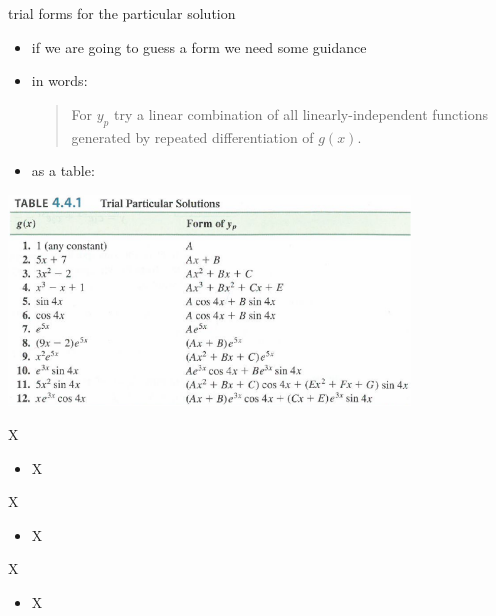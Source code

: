\documentclass{beamer}
\begin{document}
\begin{frame}{trial forms for the particular solution}

\begin{itemize}
\item if we are going to guess a form we need some guidance
\item in words:

\begin{quotation}
\noindent For $y_p$ try a linear combination of all linearly-independent functions generated by repeated differentiation of $g(x)$.
\end{quotation}

\vspace{-3mm}
\item as a table:
\end{itemize}

\hfill \includegraphics[width=0.8\textwidth]{figs/yptable}
\end{frame}


\begin{frame}{X}

\begin{itemize}
\item X
\end{itemize}
\end{frame}


\begin{frame}{X}

\begin{itemize}
\item X
\end{itemize}
\end{frame}


\begin{frame}{X}

\begin{itemize}
\item X
\end{itemize}
\end{frame}
\end{document}

